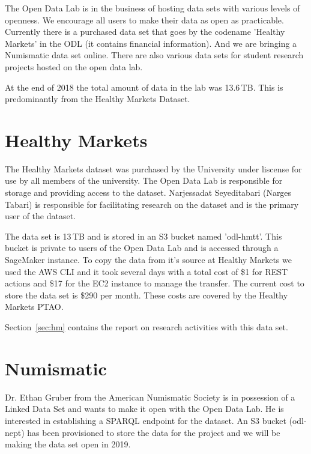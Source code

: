 The Open Data Lab is in the business of hosting data sets with various levels of openness. We encourage all users to make their data as open as practicable. Currently there is a purchased data set that goes by the codename 'Healthy Markets' in the ODL (it contains financial information). And we are bringing a Numismatic data set online. There are also various data sets for student research  projects hosted on the open data lab.

At the end of 2018 the total amount of data in the lab was  13.6\,TB. This is predominantly from the Healthy Markets Dataset.




\section{Healthy Markets}
The Healthy Markets dataset was purchased by the University under liscense for use by  all members of the university. The Open Data Lab is responsible for storage and providing access to the dataset. Narjessadat Seyeditabari (Narges Tabari) is responsible for facilitating research on the dataset and is the primary user of the dataset.

The data set is 13\,TB and is stored in an S3 bucket named 'odl-hmtt'. This bucket is private to users of the Open Data Lab and is accessed through a SageMaker instance. To copy the data from it's source at Healthy Markets we used the AWS CLI and it took several days with a total cost of \$1 for REST actions and \$17 for the EC2 instance to manage the transfer. The current cost to store the data set is \$290 per month. These costs are covered by the Healthy Markets PTAO.

Section~\ref{sec:hm} contains the report on research activities with this data set.

\section{Numismatic}
Dr. Ethan Gruber from the American Numismatic Society is in possession of a Linked Data Set  and wants to make it open with the Open Data Lab. He is interested in establishing a SPARQL endpoint for the  dataset. An S3 bucket (odl-nept) has been provisioned to store the data for the project and we will be making the data set open in  2019.